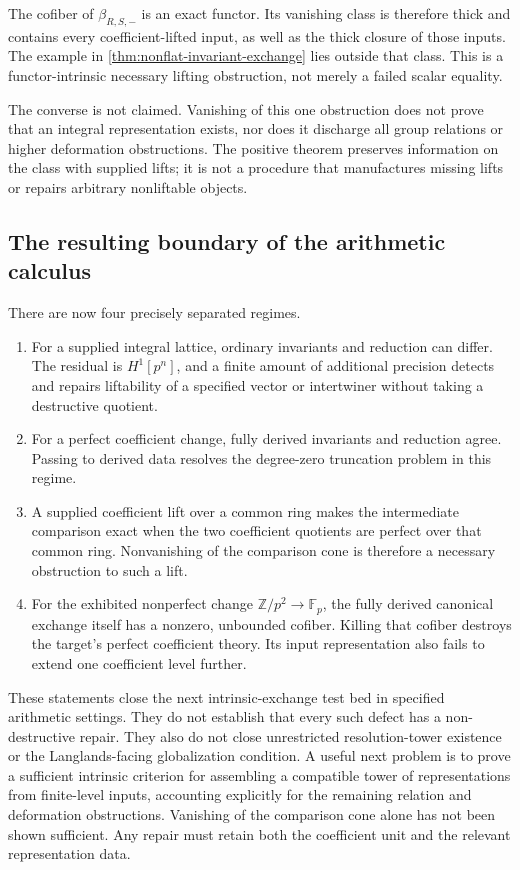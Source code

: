 The cofiber of $\beta_{R,S,-}$ is an exact functor. Its vanishing class is therefore thick and contains every coefficient-lifted input, as well as the thick closure of those inputs. The example in \cref{thm:nonflat-invariant-exchange} lies outside that class. This is a functor-intrinsic necessary lifting obstruction, not merely a failed scalar equality.

The converse is not claimed. Vanishing of this one obstruction does not prove that an integral representation exists, nor does it discharge all group relations or higher deformation obstructions. The positive theorem preserves information on the class with supplied lifts; it is not a procedure that manufactures missing lifts or repairs arbitrary nonliftable objects.

\subsection{The resulting boundary of the arithmetic calculus}

There are now four precisely separated regimes.
\begin{enumerate}
\item For a supplied integral lattice, ordinary invariants and reduction can differ. The residual is $H^1[p^n]$, and a finite amount of additional precision detects and repairs liftability of a specified vector or intertwiner without taking a destructive quotient.
\item For a perfect coefficient change, fully derived invariants and reduction agree. Passing to derived data resolves the degree-zero truncation problem in this regime.
\item A supplied coefficient lift over a common ring makes the intermediate comparison exact when the two coefficient quotients are perfect over that common ring. Nonvanishing of the comparison cone is therefore a necessary obstruction to such a lift.
\item For the exhibited nonperfect change $\mathbb Z/p^2\to\mathbb F_p$, the fully derived canonical exchange itself has a nonzero, unbounded cofiber. Killing that cofiber destroys the target's perfect coefficient theory. Its input representation also fails to extend one coefficient level further.
\end{enumerate}
These statements close the next intrinsic-exchange test bed in specified arithmetic settings. They do not establish that every such defect has a non-destructive repair. They also do not close unrestricted resolution-tower existence or the Langlands-facing globalization condition. A useful next problem is to prove a sufficient intrinsic criterion for assembling a compatible tower of representations from finite-level inputs, accounting explicitly for the remaining relation and deformation obstructions. Vanishing of the comparison cone alone has not been shown sufficient. Any repair must retain both the coefficient unit and the relevant representation data.

